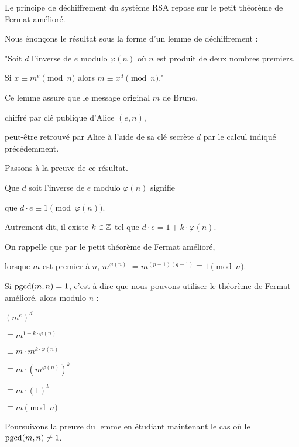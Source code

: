 

Le principe de déchiffrement du système RSA repose sur le petit théorème de Fermat amélioré.

Nous énonçons le résultat sous la forme d'un lemme de déchiffrement : 

"Soit $d$ l'inverse de $e$ modulo $\varphi(n)$ où $n$ est produit de deux nombres premiers.

{Si $x \equiv m^e \pmod n$ alors $m \equiv x^d \pmod n$.}"


Ce lemme assure que le message original $m$ de Bruno, 

chiffré par clé publique d'Alice $(e,n)$, 

peut-être retrouvé par Alice à l'aide de sa clé secrète $d$ par le calcul indiqué précédemment.

\change

Passons à la preuve de ce résultat.

Que $d$ soit l'inverse de $e$ modulo $\varphi(n)$ signifie 

\change

que $d \cdot e \equiv 1 \pmod {\varphi(n)}$.

\change

Autrement dit, il existe
$k \in \mathbb{Z}$ tel que $d \cdot e = 1 + k \cdot \varphi(n)$.

\change
 On rappelle que par le petit théorème de Fermat amélioré, 
 
\change
  lorsque $m$ est premier à $n$, $m^{\varphi(n)}$  $= m^{(p-1)(q-1)} \equiv 1 \pmod n$.

  \change
  
Si $\mathop{\mathrm{pgcd}}\nolimits(m,n)=1$, c'est-à-dire que nous pouvons utiliser le théorème de Fermat amélioré, alors modulo $n$ : 

\change

$(m^e)^d$

\change
$\equiv m^{1+k \cdot \varphi(n)}$

\change
$\equiv m \cdot m^{k \cdot \varphi(n)}$

\change
$\equiv m \cdot (m^{\varphi(n)})^k$

\change
$\equiv m \cdot (1)^k$
       
\change
$\equiv m \pmod {n}$     


\diapo


Poursuivons la preuve du lemme en étudiant maintenant le cas où le $\mathop{\mathrm{pgcd}}\nolimits(m,n)\not=1$. 

